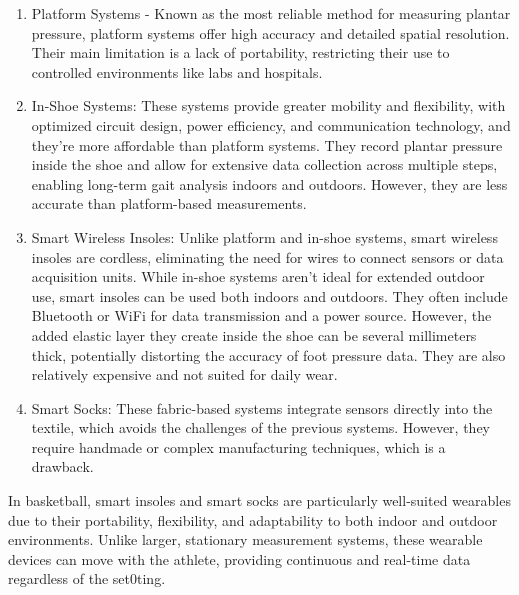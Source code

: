 \begin{enumerate}
  \item Platform Systems - Known as the most reliable method for measuring plantar pressure, platform systems offer high accuracy and detailed spatial resolution. Their main limitation is a lack of portability, restricting their use to controlled environments like labs and hospitals.
  \item In-Shoe Systems: These systems provide greater mobility and flexibility, with optimized circuit design, power efficiency, and communication technology, and they're more affordable than platform systems. They record plantar pressure inside the shoe and allow for extensive data collection across multiple steps, enabling long-term gait analysis indoors and outdoors. However, they are less accurate than platform-based measurements.
  \item Smart Wireless Insoles: Unlike platform and in-shoe systems, smart wireless insoles are cordless, eliminating the need for wires to connect sensors or data acquisition units. While in-shoe systems aren't ideal for extended outdoor use, smart insoles can be used both indoors and outdoors. They often include Bluetooth or WiFi for data transmission and a power source. However, the added elastic layer they create inside the shoe can be several millimeters thick, potentially distorting the accuracy of foot pressure data. They are also relatively expensive and not suited for daily wear.
  \item Smart Socks: These fabric-based systems integrate sensors directly into the textile, which avoids the challenges of the previous systems. However, they require handmade or complex manufacturing techniques, which is a drawback.
\end{enumerate}

In basketball, smart insoles and smart socks are particularly well-suited wearables due to their portability, flexibility, and adaptability to both indoor and outdoor environments. 
Unlike larger, stationary measurement systems, these wearable devices can move with the athlete, providing continuous and real-time data regardless of the set0ting.

